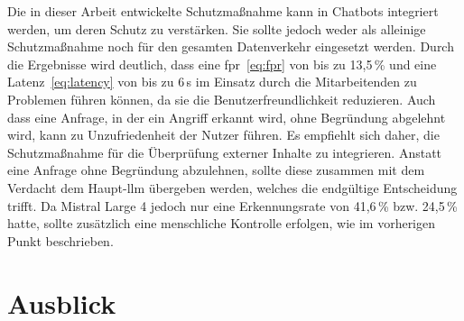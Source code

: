 Die in dieser Arbeit entwickelte Schutzmaßnahme kann in Chatbots integriert werden, um deren Schutz zu verstärken. Sie sollte jedoch weder als alleinige
Schutzmaßnahme noch für den gesamten Datenverkehr eingesetzt werden. Durch die Ergebnisse wird deutlich, dass eine \ac{fpr}~\eqref{eq:fpr} von bis zu 13,5\,\% und eine Latenz~\eqref{eq:latency}
von bis zu 6\,s im Einsatz durch die Mitarbeitenden zu Problemen führen können, da sie die Benutzerfreundlichkeit reduzieren. Auch dass eine Anfrage, in der ein Angriff erkannt wird,
ohne Begründung abgelehnt wird, kann zu Unzufriedenheit der Nutzer führen. Es empfiehlt sich daher, die Schutzmaßnahme für die Überprüfung externer Inhalte zu
integrieren. Anstatt eine Anfrage ohne Begründung abzulehnen, sollte diese zusammen mit dem Verdacht dem Haupt-\ac{llm} übergeben werden, welches die endgültige
Entscheidung trifft. Da Mistral Large 4 jedoch nur eine Erkennungsrate von 41,6\,\% bzw. 24,5\,\% hatte, sollte zusätzlich eine menschliche Kontrolle erfolgen, wie im
vorherigen Punkt beschrieben.

\section{Ausblick}

